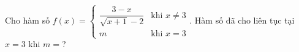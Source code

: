 \begin{ex}
Cho hàm số $f(x)=\begin{cases}\dfrac{3-x}{\sqrt{x+1}-2}&\text{khi }x\ne3\\m&\text{khi }x=3\end{cases}$. Hàm số đã cho liên tục tại $x=3$ khi $m=$?
\end{ex}
